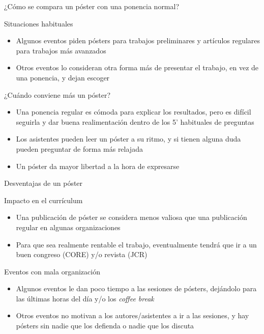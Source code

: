 \documentclass[xcolor=svgnames,compress]{beamer}
\begin{document}
\begin{frame}{¿Cómo se compara un póster con una ponencia normal?}

  \begin{block}{Situaciones habituales}
    \begin{itemize}
    \item Algunos eventos piden pósters para trabajos preliminares y
      artículos regulares para trabajos más avanzados
    \item Otros eventos lo consideran otra forma más de presentar el
      trabajo, en vez de una ponencia, y dejan escoger
    \end{itemize}
  \end{block}

  \begin{block}{¿Cuándo conviene más un póster?}
    \begin{itemize}
    \item Una ponencia regular es cómoda para explicar los resultados,
      pero es difícil seguirla y dar buena realimentación dentro de
      los 5' habituales de preguntas
    \item Los asistentes pueden leer un póster a su ritmo, y si
      tienen alguna duda pueden preguntar de forma más relajada
    \item Un póster da mayor libertad a la hora de expresarse
    \end{itemize}
  \end{block}

\end{frame}

\begin{frame}{Desventajas de un póster}

  \begin{block}{Impacto en el currículum}
    \begin{itemize}
    \item Una publicación de póster se considera menos valiosa que una
      publicación regular en algunas organizaciones
    \item Para que sea realmente rentable el trabajo, eventualmente
      tendrá que ir a un buen congreso (CORE) y/o revista (JCR)
    \end{itemize}
  \end{block}

  \begin{block}{Eventos con mala organización}
    \begin{itemize}
    \item Algunos eventos le dan poco tiempo a las sesiones de
      pósters, dejándolo para las últimas horas del día y/o los
      \emph{coffee break}
    \item Otros eventos no motivan a los autores/asistentes a ir a las
      sesiones, y hay pósters sin nadie que los defienda o nadie que
      los discuta
    \end{itemize}
  \end{block}

\end{frame}
\end{document}
